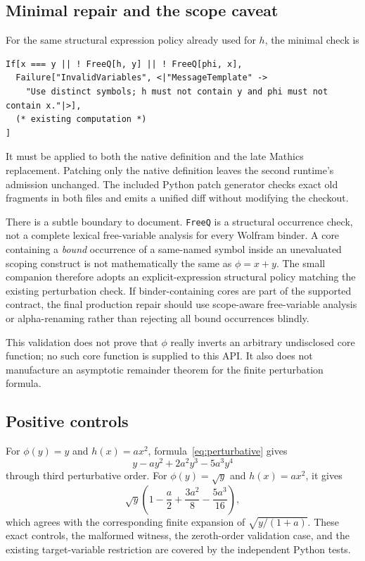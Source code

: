 \documentclass[11pt,letterpaper]{article}
\newcommand{\code}[1]{\nolinkurl{#1}}
\begin{document}
\subsection{Minimal repair and the scope caveat}
For the same structural expression policy already used for \(h\), the minimal check is
\par\noindent\begin{minipage}{\linewidth}
\begin{lstlisting}
If[x === y || ! FreeQ[h, y] || ! FreeQ[phi, x],
  Failure["InvalidVariables", <|"MessageTemplate" ->
    "Use distinct symbols; h must not contain y and phi must not contain x."|>],
  (* existing computation *)
]
\end{lstlisting}
\end{minipage}\par
It must be applied to both the native definition and the late Mathics replacement. Patching only the native definition leaves the second runtime's admission unchanged. The included Python patch generator checks exact old fragments in both files and emits a unified diff without modifying the checkout.

There is a subtle boundary to document. \code{FreeQ} is a structural occurrence check, not a complete lexical free-variable analysis for every Wolfram binder. A core containing a \emph{bound} occurrence of a same-named symbol inside an unevaluated scoping construct is not mathematically the same as \(\phi=x+y\). The small companion therefore adopts an explicit-expression structural policy matching the existing perturbation check. If binder-containing cores are part of the supported contract, the final production repair should use scope-aware free-variable analysis or alpha-renaming rather than rejecting all bound occurrences blindly.

This validation does not prove that \(\phi\) really inverts an arbitrary undisclosed core function; no such core function is supplied to this API. It also does not manufacture an asymptotic remainder theorem for the finite perturbation formula.

\subsection{Positive controls}
For \(\phi(y)=y\) and \(h(x)=a x^2\), formula~\eqref{eq:perturbative} gives
\[
 y-a y^2+2a^2y^3-5a^3y^4
\]
through third perturbative order. For \(\phi(y)=\sqrt y\) and \(h(x)=a x^2\), it gives
\[
 \sqrt y\left(1-\frac a2+\frac{3a^2}{8}-\frac{5a^3}{16}\right),
\]
which agrees with the corresponding finite expansion of \(\sqrt{y/(1+a)}\). These exact controls, the malformed witness, the zeroth-order validation case, and the existing target-variable restriction are covered by the independent Python tests.
\end{document}
